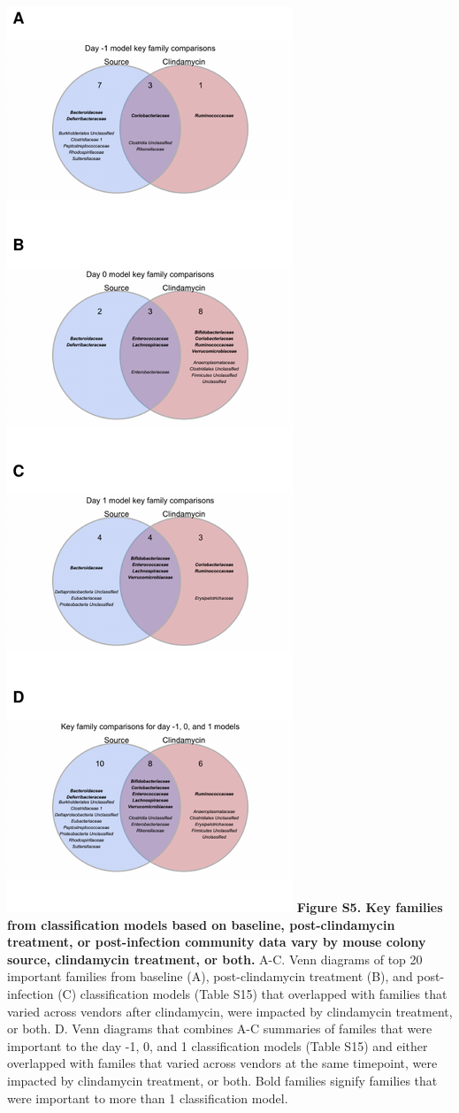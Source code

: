\documentclass[11pt,]{article}
\begin{document}
\includegraphics{figure_S5.pdf} \textbf{Figure S5. Key families from
classification models based on baseline, post-clindamycin treatment, or
post-infection community data vary by mouse colony source, clindamycin
treatment, or both.} A-C. Venn diagrams of top 20 important families
from baseline (A), post-clindamycin treatment (B), and post-infection
(C) classification models (Table S15) that overlapped with families that
varied across vendors after clindamycin, were impacted by clindamycin
treatment, or both. D. Venn diagrams that combines A-C summaries of
familes that were important to the day -1, 0, and 1 classification
models (Table S15) and either overlapped with familes that varied across
vendors at the same timepoint, were impacted by clindamycin treatment,
or both. Bold families signify families that were important to more than
1 classification model.
\end{document}
